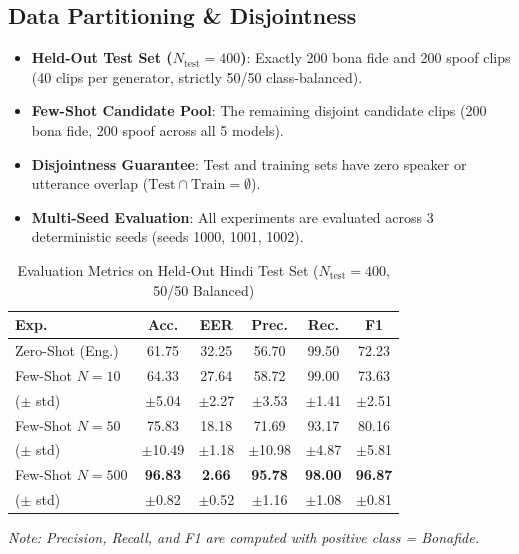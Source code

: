 \documentclass[conference]{IEEEtran}
\begin{document}
\subsection{Data Partitioning \& Disjointness}

\begin{itemize}
    \item \textbf{Held-Out Test Set ($N_{\text{test}} = 400$)}: Exactly 200 bona fide and 200 spoof clips (40 clips per generator, strictly 50/50 class-balanced).

    \item \textbf{Few-Shot Candidate Pool}: The remaining disjoint candidate clips (200 bona fide, 200 spoof across all 5 models).

    \item \textbf{Disjointness Guarantee}: Test and training sets have zero speaker or utterance overlap ($\text{Test} \cap \text{Train} = \emptyset$).

    \item \textbf{Multi-Seed Evaluation}: All experiments are evaluated across 3 deterministic seeds (seeds 1000, 1001, 1002).
\end{itemize}

\begin{table}[t]
\caption{Evaluation Metrics on Held-Out Hindi Test Set ($N_{\text{test}} = 400$, 50/50 Balanced)}
\label{tab:main_results}
\centering
\setlength{\tabcolsep}{3pt}
\begin{tabular}{lccccc}
\toprule
\textbf{Exp.} & \textbf{Acc.} & \textbf{EER} & \textbf{Prec.} & \textbf{Rec.} & \textbf{F1} \\
\midrule
Zero-Shot (Eng.) & 61.75 & 32.25 & 56.70 & 99.50 & 72.23 \\
Few-Shot $N=10$ & 64.33 & 27.64 & 58.72 & 99.00 & 73.63 \\
\quad ($\pm$ std) & $\pm$5.04 & $\pm$2.27 & $\pm$3.53 & $\pm$1.41 & $\pm$2.51 \\
Few-Shot $N=50$ & 75.83 & 18.18 & 71.69 & 93.17 & 80.16 \\
\quad ($\pm$ std) & $\pm$10.49 & $\pm$1.18 & $\pm$10.98 & $\pm$4.87 & $\pm$5.81 \\
Few-Shot $N=500$ & \textbf{96.83} & \textbf{2.66} & \textbf{95.78} & \textbf{98.00} & \textbf{96.87} \\
\quad ($\pm$ std) & $\pm$0.82 & $\pm$0.52 & $\pm$1.16 & $\pm$1.08 & $\pm$0.81 \\
\bottomrule
\end{tabular}
\vspace{1mm}

\footnotesize{\textit{Note: Precision, Recall, and F1 are computed with positive class = Bonafide.}}
\end{table}
\end{document}
